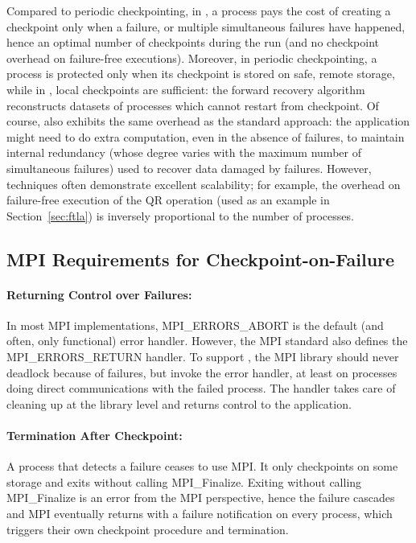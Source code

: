 
Compared to periodic checkpointing, in \cof, a process
pays the cost of creating a checkpoint only when a failure, or multiple simultaneous 
failures have happened,
hence an optimal number of checkpoints during the run (and no checkpoint
overhead on failure-free executions). Moreover, in periodic checkpointing,
a process is protected only when its checkpoint is stored on safe,
remote storage, while in \cof, local checkpoints are
sufficient: the forward recovery algorithm reconstructs datasets of
processes which cannot restart from checkpoint. 
Of course, \cof also exhibits the same overhead as the standard \abft approach: the
application might need to do extra computation, even in the absence of
failures, to maintain internal redundancy (whose degree varies with the 
maximum number of simultaneous failures) used to recover data damaged
by failures. However, \abft techniques often demonstrate excellent
scalability; for example, the overhead on failure-free execution of the
\abft QR operation (used as an example in Section~\ref{sec:ftla}) is inversely
proportional to the number of processes.

\subsection{MPI Requirements for Checkpoint-on-Failure}\label{sec:interface}

\paragraph*{Returning Control over Failures:} In most MPI
implementations, MPI\_ERRORS\_ABORT is the default (and often, only
functional) error handler. However, the MPI standard also defines the
MPI\_ERRORS\_RETURN handler. To support \cof, the MPI
library should never deadlock because of failures, but invoke the error handler, at least on
processes doing direct communications with the failed process. The
handler takes care of cleaning up at the library level and returns
control to the application.

\paragraph*{Termination After Checkpoint:} A process that detects a
failure ceases to use MPI. It only checkpoints on some storage and
exits without calling MPI\_Finalize. Exiting without calling
MPI\_Finalize is an error from the MPI perspective, hence the failure
cascades and MPI eventually returns with a failure notification on every process, which triggers their own checkpoint procedure and termination.

